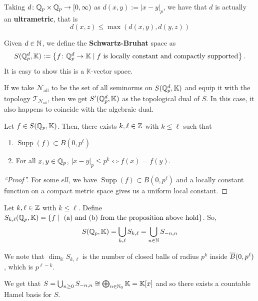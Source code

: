 \documentclass[11pt,leqno,oneside]{amsbook}
\numberwithin{thm}{section}
\newcommand{\Top}{\mathcal{T}} %
\newcommand{\cN}{\mathcal{N}}
\newcommand{\norms}{\cN}
\newcommand{\K}{\mathbb{K}} %
\newcommand{\supp}{\operatorname{Supp}}
\renewcommand{\de}{\textbf} %
\begin{document}
\begin{rmk}
  Taking \(d \colon {\mathbb Q}_p \times {\mathbb Q}_p \to [0,\infty)\) as \(d(x,y) :=
  |x-y|_p\), we have that \(d\) is actually an \de{ultrametric}, that
  is \[
    d(x,z) \leq \max(d(x,y), d(y,z))
  \]
\end{rmk}
\begin{defn}
  Given \(d \in {\mathbb N}\), we define the \de{Schwartz-Bruhat} space as \[
    S(\Q_p^d,\K) := \left\{ f \from \Q_p^d \to \K \st f \text{ is
        locally constant and compactly supported} \right\}.
  \]
  It is easy to show this is a \(\K\)-vector space.
\end{defn}
\begin{example}
  If we take \(\norms_\text{all}\) to be the set of all seminorms on
  \(S(\Q_p^d,\K)\) and equip it with the topology
  \(\Top_{\norms_\text{all}}\), then we get \(S'(\Q_p^d,\K)\) as the
  topological dual of \(S\). In this case, it also happens to coincide
  with the algebraic dual.
\end{example}
\begin{prop}
  Let \(f \in S(\Q_p,\K)\). Then, there exists \(k,\ell \in {\mathbb Z}\) with
  \(k \leq \ell\) such that
  \begin{enumerate}
  \item \(\supp(f) \subset B(0,p^\ell)\)
  \item For all \(x,y \in {\mathbb Q}_p\), \(|x-y|_p \leq p^k \iff f(x) =
    f(y)\).
  \end{enumerate}
\end{prop}
\begin{proof}[``Proof'']
  For some \(ell\), we have \(\supp(f) \subset B(0,p^\ell)\) and a
  locally constant function on a compact metric space gives us a
  uniform local constant.
\end{proof}
\begin{defn}
  Let \(k,\ell \in {\mathbb Z}\) with \(k \leq \ell\). Define
  \(S_{k,\ell}(\Q_p,\K) = \{f \st \text{ (a) and (b) from the
    proposition above hold}\}\). So, \[
    S(\Q_p,\K) = \Union_{k,\ell} S_{k,\ell} = \Union_{n \in \N} S_{-n,n}
  \]
\end{defn}
We note that \(\dim_\K S_{k,\ell}\) is the number of closed balls of
radius \(p^k\) inside \(\overline{B}(0,p^\ell)\), which is \(p^{\ell-k}\).
\begin{rmk}
  We get that \(S = \Union_{n \geq 0} S_{-n,n} \isom \bigoplus_{n \in
    \N_0} \K = \K[x] \) and so there exists a countable Hamel basis
  for \(S\).
\end{rmk}
\end{document}
